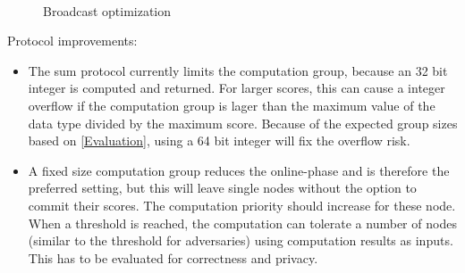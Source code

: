 \begin{figure}[!htb] %
	\centering
	\\
	\caption{Broadcast optimization} \label{figure:broadcast optimization}
\end{figure}
 
Protocol improvements:
\begin{itemize}
	\item The sum protocol currently limits the computation group, because an 32 bit integer is computed and returned. For larger scores, this can cause a integer overflow if the computation group is lager than the maximum value of the data type divided by the maximum score. Because of the expected group sizes based on \autoref{Evaluation}, using a 64 bit integer will fix the overflow risk.
	\item A fixed size computation group reduces the online-phase and is therefore the preferred setting, but this will leave single nodes without the option to commit their scores. The computation priority should increase for these node. When a threshold is reached, the computation can tolerate a number of nodes (similar to the threshold for adversaries) using computation results as inputs. This has to be evaluated for correctness and privacy.
\end{itemize}

